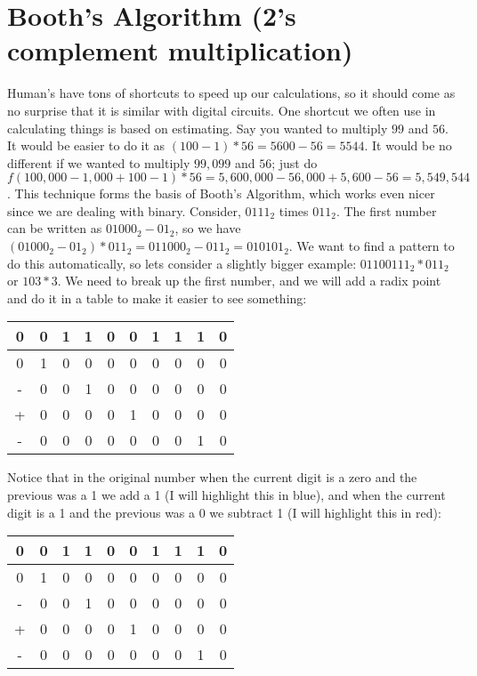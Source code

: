 \chapter{Booth's Algorithm (2's complement multiplication)}

Human's have tons of shortcuts to speed up our calculations, so it should come as no surprise that it is similar with digital circuits.  One shortcut we often use in calculating things is based on estimating.  Say you wanted to multiply $99$ and $56$.  It would be easier to do it as $(100-1)*56=5600-56=5544$.  It would be no different if we wanted to multiply $99,099$ and $56$; just do $f(100,000-1,000+100-1)*56=5,600,000-56,000+5,600-56=5,549,544$.  This technique forms the basis of Booth's Algorithm, which works even nicer since we are dealing with binary.  Consider, $0111_2$ times $011_2$.  The first number can be written as $01000_2 - 01_2$, so we have $(01000_2-01_2)*011_2=011000_2-011_2=010101_2$.  We want to find a pattern to do this automatically, so lets consider a slightly bigger example: $01100111_2 * 011_2$ or $103* 3$.  We need to break up the first number, and we will add a radix point and do it in a table to make it easier to see something:

\begin{tabular}{ccccccccc@{ . }c}
0 & 0 & 1 & 1 & 0 & 0 & 1 & 1 & 1 & 0\\ \hline
0 & 1 & 0 & 0 & 0 & 0 & 0 & 0 & 0 & 0\\
- & 0 & 0 & 1 & 0 & 0 & 0 & 0 & 0 & 0\\
+ & 0 & 0 & 0 & 0 & 1 & 0 & 0 & 0 & 0\\
- & 0 & 0 & 0 & 0 & 0 & 0 & 0 & 1 & 0\\
\end{tabular}

Notice that in the original number when the current digit is a zero and the previous was a 1 we add a 1 (I will highlight this in blue), and when the current digit is a 1 and the previous was a 0 we subtract 1 (I will highlight this in red):

\begin{tabular}{ccccccccc@{ . }c}
0 & {\color{blue}0}
      & {\color{blue}1}
          & {\color{red}1}
              & {\color{red}0}
                  & {\color{blue}0}
                      & {\color{blue}1}
                          & 1 & {\color{red}1}
                                  & {\color{red}0}\\ \hline
0 & {\color{blue}1}
      & 0 & 0 & 0 & 0 & 0 & 0 & 0 & 0\\
- & 0 & 0 & {\color{red}1}
              & 0 & 0 & 0 & 0 & 0 & 0\\
+ & 0 & 0 & 0 & 0 & {\color{blue}1}
                      & 0 & 0 & 0 & 0\\
- & 0 & 0 & 0 & 0 & 0 & 0 & 0 & {\color{red}1}
                                  & 0\\
\end{tabular}

